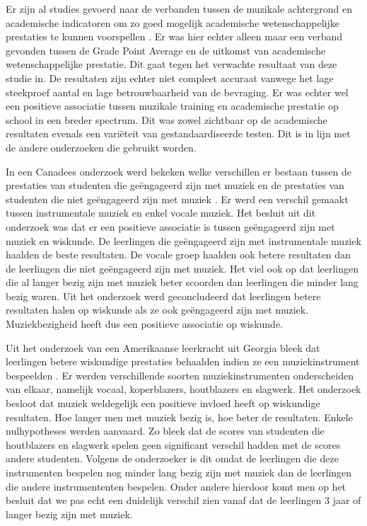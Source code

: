 \documentclass{hogent-article}
\begin{document}

Er zijn al studies gevoerd naar de verbanden tussen de muzikale achtergrond en academische indicatoren om zo goed mogelijk academische wetenschappelijke prestaties te kunnen voorspellen \autocite{Brown2017}. Er was hier echter alleen maar een verband gevonden tussen de Grade Point Average en de uitkomst van academische wetenschappelijke prestatie. Dit gaat tegen het verwachte resultaat van deze studie in. De resultaten zijn echter niet compleet accuraat vanwege het lage steekproef aantal en lage betrouwbaarheid van de bevraging. Er was echter wel een positieve associatie tussen muzikale training en academische prestatie op school in een breder spectrum. Dit was zowel zichtbaar op de academische resultaten evenals een variëteit van gestandaardiseerde testen. Dit is in lijn met de andere onderzoeken die gebruikt worden.

In een Canadees onderzoek werd bekeken welke verschillen er bestaan tussen de prestaties van studenten die geëngageerd zijn met muziek en de prestaties van studenten die niet geëngageerd zijn met muziek \autocite{Boyd2013}. Er werd een verschil gemaakt tussen instrumentale muziek en enkel vocale muziek.
Het besluit uit dit onderzoek was dat er een positieve associatie is tussen geëngageerd zijn met muziek en wiskunde. De leerlingen die geëngageerd zijn met instrumentale muziek haalden de beste resultaten. De vocale groep haalden ook betere resultaten dan de leerlingen die niet geëngageerd zijn met muziek.
Het viel ook op dat leerlingen die al langer bezig zijn met muziek beter scoorden dan leerlingen die minder lang bezig waren.
Uit het onderzoek werd geconcludeerd dat leerlingen betere resultaten halen op wiskunde als ze ook geëngageerd zijn met muziek. Muziekbezigheid heeft dus een positieve associatie op wiskunde.

Uit het onderzoek van een Amerikaanse leerkracht uit Georgia bleek dat leerlingen betere wiskundige prestaties behaalden indien ze een muziekinstrument bespeelden \autocite{Sanders2018}.
Er werden verschillende soorten muziekinstrumenten onderscheiden van elkaar, namelijk vocaal, koperblazers, houtblazers en slagwerk.
Het onderzoek besloot dat muziek weldegelijk een positieve invloed heeft op wiskundige resultaten.
Hoe langer men met muziek bezig is, hoe beter de resultaten.
Enkele nulhypotheses werden aanvaard. Zo bleek dat de scores van studenten die houtblazers en slagwerk spelen geen significant verschil hadden met de scores andere studenten. Volgens de onderzoeker is dit omdat de leerlingen die deze instrumenten bespelen nog minder lang bezig zijn met muziek dan de leerlingen die andere instrumententen bespelen.
Onder andere hierdoor komt men op het besluit dat we pas echt een duidelijk verschil zien vanaf dat de leerlingen 3 jaar of langer bezig zijn met muziek.
\end{document}
